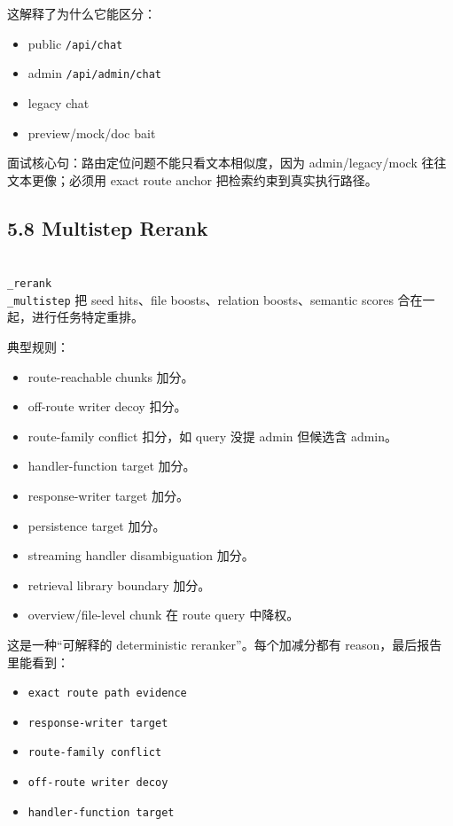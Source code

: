 \documentclass[UTF8,12pt,openany]{ctexbook}
\begin{document}
这解释了为什么它能区分：\par

\begin{itemize}
\item public \texttt{/api/chat}
\item admin \texttt{/api/admin/chat}
\item legacy chat
\item preview/mock/doc bait
\end{itemize}

面试核心句：路由定位问题不能只看文本相似度，因为 admin/legacy/mock 往往文本更像；必须用 exact route anchor 把检索约束到真实执行路径。\par

\subsection{5.8 Multistep Rerank}

\texttt{\\_rerank\\_multistep} 把 seed hits、file boosts、relation boosts、semantic scores 合在一起，进行任务特定重排。\par

典型规则：\par

\begin{itemize}
\item route-reachable chunks 加分。
\item off-route writer decoy 扣分。
\item route-family conflict 扣分，如 query 没提 admin 但候选含 admin。
\item handler-function target 加分。
\item response-writer target 加分。
\item persistence target 加分。
\item streaming handler disambiguation 加分。
\item retrieval library boundary 加分。
\item overview/file-level chunk 在 route query 中降权。
\end{itemize}

这是一种“可解释的 deterministic reranker”。每个加减分都有 reason，最后报告里能看到：\par

\begin{itemize}
\item \texttt{exact route path evidence}
\item \texttt{response-writer target}
\item \texttt{route-family conflict}
\item \texttt{off-route writer decoy}
\item \texttt{handler-function target}
\end{itemize}
\end{document}
